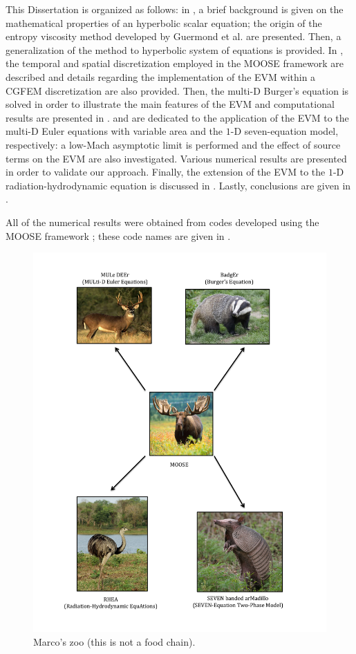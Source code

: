 This Dissertation is organized as follows: in , a brief background is given on the mathematical properties of an hyperbolic scalar equation; the origin of the entropy viscosity method developed by Guermond et al. \cite{jlg1} are presented. Then, a generalization of the method to hyperbolic system of equations is provided. In , the temporal and spatial discretization employed in the MOOSE framework \cite{Moose} are described and details regarding the implementation of the EVM within a CGFEM discretization are also provided. Then, the multi-D Burger's equation is solved in order to illustrate the main features of the EVM and computational results are presented in .  and  are dedicated to the application of the EVM to the multi-D Euler equations with variable area and the $1$-D seven-equation model, respectively: a low-Mach asymptotic limit is performed and the effect of source terms on the EVM are also investigated. Various numerical results are presented in order to validate our approach. Finally, the extension of the EVM to the $1$-D radiation-hydrodynamic equation is discussed in . Lastly, conclusions are given in  . 

All of the numerical results were obtained from codes developed using the MOOSE framework \cite{Moose}; these code  names are given in .
%
\begin{figure}[H]
\centering
\includegraphics[width=\textwidth]{figures/organigram.pdf}
\caption{Marco's zoo (this is not a food chain). \label{fig:organigram}}
\end{figure}
%